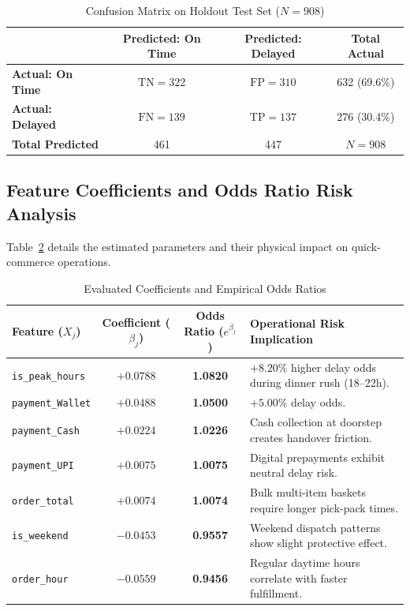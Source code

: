 \documentclass[11pt,a4paper]{article}
\begin{document}
\begin{table}[H]
\centering
\caption{Confusion Matrix on Holdout Test Set ($N = 908$)}
\label{tab:cm}
\begin{tabular}{l|cc|c}
\toprule
& \textbf{Predicted: On Time} & \textbf{Predicted: Delayed} & \textbf{Total Actual} \\
\midrule
\textbf{Actual: On Time} & $\text{TN} = 322$ & $\text{FP} = 310$ & 632 (69.6\%) \\
\textbf{Actual: Delayed} & $\text{FN} = 139$ & $\text{TP} = 137$ & 276 (30.4\%) \\
\midrule
\textbf{Total Predicted} & 461 & 447 & $N = 908$ \\
\bottomrule
\end{tabular}
\end{table}

\subsection{Feature Coefficients and Odds Ratio Risk Analysis}
Table~\ref{tab:odds_results} details the estimated parameters and their physical impact on quick-commerce operations.

\begin{table}[H]
\centering
\caption{Evaluated Coefficients and Empirical Odds Ratios}
\label{tab:odds_results}
\begin{tabularx}{\linewidth}{lccl}
\toprule
\textbf{Feature ($X_j$)} & \textbf{Coefficient ($\beta_j$)} & \textbf{Odds Ratio ($e^{\beta_j}$)} & \textbf{Operational Risk Implication} \\
\midrule
\texttt{is\_peak\_hours}       & $+0.0788$ & \textbf{1.0820} & $+8.20\%$ higher delay odds during dinner rush (18--22h). \\
\texttt{payment\_Wallet}       & $+0.0488$ & \textbf{1.0500} & $+5.00\%$ delay odds. \\
\texttt{payment\_Cash}         & $+0.0224$ & \textbf{1.0226} & Cash collection at doorstep creates handover friction. \\
\texttt{payment\_UPI}          & $+0.0075$ & \textbf{1.0075} & Digital prepayments exhibit neutral delay risk. \\
\texttt{order\_total}          & $+0.0074$ & \textbf{1.0074} & Bulk multi-item baskets require longer pick-pack times. \\
\texttt{is\_weekend}           & $-0.0453$ & \textbf{0.9557} & Weekend dispatch patterns show slight protective effect. \\
\texttt{order\_hour}           & $-0.0559$ & \textbf{0.9456} & Regular daytime hours correlate with faster fulfillment. \\
\bottomrule
\end{tabularx}
\end{table}
\end{document}
